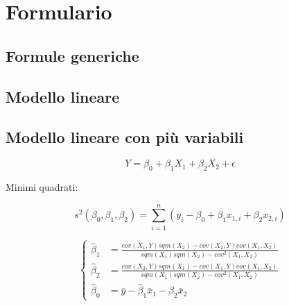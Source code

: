 \chapter{Formulario}

\section{Formule generiche}

\section{Modello lineare}

\section{Modello lineare con più variabili}

$$
Y = \beta_0 + \beta_1 X_1+\beta_2X_2 + \epsilon
$$

Minimi quadrati:

$$
s^2(\beta_0, \beta_1, \beta_2) = \sum\limits_{i=1}^n(y_i - \beta_0 + \beta_1 x_{1,i}+\beta_2 x_{2,i} )
$$

$$
\begin{cases}
\hat{\beta}_1 &= \frac{cov(X_1,Y)sqm(X_2) - cov(X_2, Y)cov(X_1,X_2)}{sqm(X_1)sqm(X_2)- cov^2(X_1,X_2)} \\
\hat{\beta}_2 &= \frac{cov(X_2,Y)sqm(X_1) - cov(X_1, Y)cov(X_1,X_2)}{sqm(X_1)sqm(X_2)- cov^2(X_1,X_2)}  \\
\hat{\beta}_0 &= \bar{y} - \hat{\beta}_1\bar{x}_1 - \hat{\beta}_2\bar{x}_2
\end{cases}
$$